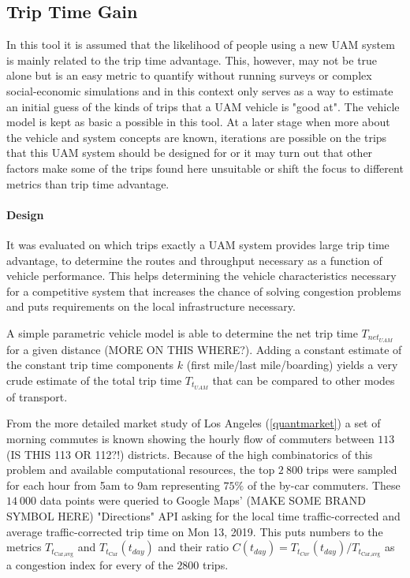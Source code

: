 \iffalse
\subsection{Trip Time Gain}

In this tool it is assumed that the likelihood of people using a new UAM system is mainly related to the trip time advantage. This, however, may not be true alone but is an easy metric to quantify without running surveys or complex social-economic simulations and in this context only serves as a way to estimate an initial guess of the kinds of trips that a UAM vehicle is "good at". The vehicle model is kept as basic a possible in this tool. At a later stage when more about the vehicle and system concepts are known, iterations are possible on the trips that this UAM system should be designed for or it may turn out that other factors make some of the trips found here unsuitable or shift the focus to different metrics than trip time advantage.

\paragraph{Design}

It was evaluated on which trips exactly a UAM system provides large trip time advantage, to determine the routes and throughput necessary as a function of vehicle performance. This helps determining the vehicle characteristics necessary for a competitive system that increases the chance of solving congestion problems and puts requirements on the local infrastructure necessary.

A simple parametric vehicle model is able to determine the net trip time $T_{{net}_{UAM}}$ for a given distance (MORE ON THIS WHERE?). Adding a constant estimate of the constant trip time components $k$ (first mile/last mile/boarding) yields a very crude estimate of the total trip time $T_{{t}_{UAM}}$ that can be compared to other modes of transport.

From the more detailed market study of Los Angeles (\autoref{quantmarket}) a set of morning commutes is known showing the hourly flow of commuters between $113$ (IS THIS 113 OR 112?!) districts. Because of the high combinatorics of this problem and available computational resources, the top $2\ 800$ trips were sampled for each hour from 5am to 9am representing $75\%$ of the by-car commuters. These $14\ 000$ data points were queried to Google Maps' (MAKE SOME BRAND SYMBOL HERE) "Directions" API asking for the local time traffic-corrected and average traffic-corrected trip time on Mon 13, 2019. This puts numbers to the metrics $T_{t_{\text{Car},\text{avg} }}$ and $T_{t_{\text{Car} }}(t_{day})$ and their ratio $C(t_{day}) = T_{t_{Car}}(t_{day}) / T_{t_{\text{Car},\text{avg}} }$ as a congestion index for every of the $2800$ trips.

